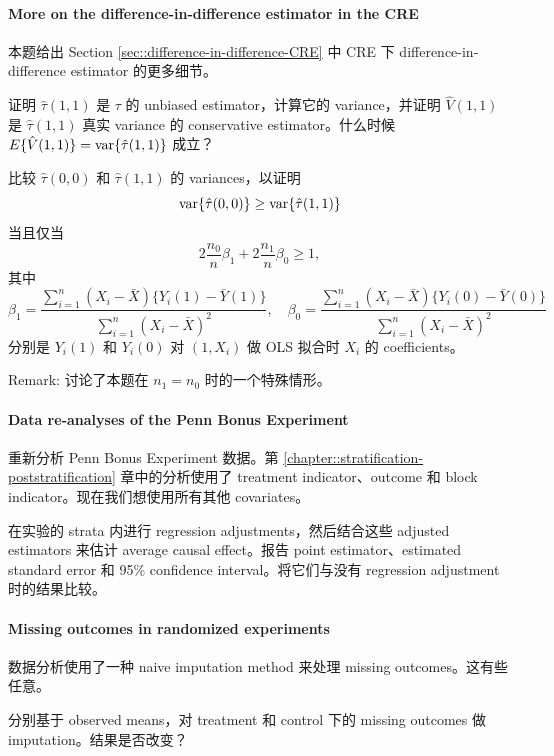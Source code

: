 \paragraph{More on the difference-in-difference estimator in the CRE}\label{hw::did-CRE}

本题给出 Section \ref{sec::difference-in-difference-CRE} 中 CRE 下 difference-in-difference estimator 的更多细节。

证明 $\hat{\tau}(1,1) $ 是 $\tau$ 的 unbiased estimator，计算它的 variance，并证明 $\hat{V}( 1,1 ) $ 是 $\hat{\tau}(1,1) $ 真实 variance 的 conservative estimator。什么时候 $E\{\hat{V}( 1,1 ) \} = \textup{var}\{  \hat{\tau}(1,1)  \}$ 成立？

比较 $\hat{\tau}(0,0) $ 和 $\hat{\tau}(1,1) $ 的 variances，以证明
$$
\textup{var}\{ \hat{\tau}(0,0) \}  \geq \textup{var}\{  \hat{\tau}(1,1)  \}
$$
当且仅当
$$
2 \frac{n_0}{n} \beta_1 + 2\frac{n_1}{n} \beta_0 \geq 1,
$$
其中
$$
\beta_1 = \frac{\sum_{i=1}^n (X_i-\bar{X})\{  Y_i(1)-\bar{Y}(1) \}  }{  \sum_{i=1}^n (X_i-\bar{X})^2 },\quad
\beta_0 = \frac{\sum_{i=1}^n (X_i-\bar{X})\{  Y_i(0)-\bar{Y}(0) \}  }{  \sum_{i=1}^n (X_i-\bar{X})^2 }
$$
分别是 $Y_i(1)$ 和 $Y_i(0)$ 对 $(1,X_i)$ 做 OLS 拟合时 $X_i$ 的 coefficients。

Remark: \citet[][page 28]{gerber2012field} 讨论了本题在 $n_1=n_0$ 时的一个特殊情形。

\paragraph{Data re-analyses of the Penn Bonus Experiment}

重新分析 Penn Bonus Experiment 数据。第 \ref{chapter::stratification-poststratification} 章中的分析使用了 treatment indicator、outcome 和 block indicator。现在我们想使用所有其他 covariates。

在实验的 strata 内进行 regression adjustments，然后结合这些 adjusted estimators 来估计 average causal effect。报告 point estimator、estimated standard error 和 95\% confidence interval。将它们与没有 regression adjustment 时的结果比较。
 
\paragraph{Missing outcomes in randomized experiments}\label{hw::missing-y-experiments}

数据分析使用了一种 naive imputation method 来处理 missing outcomes。这有些任意。

分别基于 observed means，对 treatment 和 control 下的 missing outcomes 做 imputation。结果是否改变？

